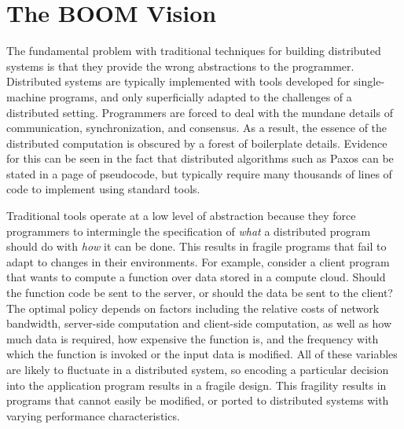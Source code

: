 \documentclass{article}
\begin{document}
\section{The BOOM Vision}
The fundamental problem with traditional techniques for building
distributed systems is that they provide the wrong abstractions to the
programmer. Distributed systems are typically implemented with tools
developed for single-machine programs, and only superficially adapted
to the challenges of a distributed setting. Programmers are forced to
deal with the mundane details of communication, synchronization, and
consensus. As a result, the essence of the distributed computation is
obscured by a forest of boilerplate details. Evidence for this can be
seen in the fact that distributed algorithms such as Paxos can be
stated in a page of pseudocode, but typically require many thousands
of lines of code to implement using standard
tools\cite{paxosmadelive}.

Traditional tools operate at a low level of abstraction because they
force programmers to intermingle the specification of \emph{what} a
distributed program should do with \emph{how} it can be done. This
results in fragile programs that fail to adapt to changes in their
environments. For example, consider a client program that wants to
compute a function over data stored in a compute cloud. Should the
function code be sent to the server, or should the data be sent to the
client? The optimal policy depends on factors including the relative
costs of network bandwidth, server-side computation and client-side
computation, as well as how much data is required, how expensive the
function is, and the frequency with which the function is invoked or
the input data is modified. All of these variables are likely to
fluctuate in a distributed system, so encoding a particular decision
into the application program results in a fragile design. This
fragility results in programs that cannot easily be modified, or
ported to distributed systems with varying performance
characteristics.
\end{document}
